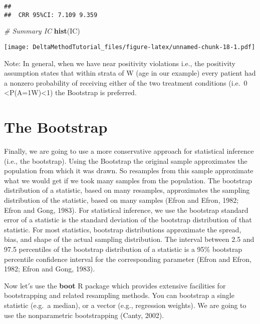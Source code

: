 \documentclass[
]{article}
\newenvironment{Shaded}{\begin{snugshade}}{\end{snugshade}}
\newcommand{\CommentTok}[1]{\textcolor[rgb]{0.56,0.35,0.01}{\textit{#1}}}
\newcommand{\KeywordTok}[1]{\textcolor[rgb]{0.13,0.29,0.53}{\textbf{#1}}}
\newcommand{\NormalTok}[1]{#1}
\begin{document}
\begin{verbatim}
## 
##  CRR 95%CI: 7.109 9.359
\end{verbatim}

\begin{Shaded}
\begin{Highlighting}[]
\CommentTok{# Summary IC}
\KeywordTok{hist}\NormalTok{(IC)}
\end{Highlighting}
\end{Shaded}

\texttt{[image: DeltaMethodTutorial\_files/figure-latex/unnamed-chunk-18-1.pdf]}

Note: In general, when we have near positivity violations i.e., the
positivity assumption states that within strata of W (age in our
example) every patient had a nonzero probability of receiving either of
the two treatment conditions (i.e.~0
\textless P(A=1\textbar W)\textless1) the Bootstrap is preferred.

\hypertarget{the-bootstrap}{%
\section{The Bootstrap}\label{the-bootstrap}}

Finally, we are going to use a more conservative approach for
statistical inference (i.e., the bootstrap). Using the Bootstrap the
original sample approximates the population from which it was drawn. So
resamples from this sample approximate what we would get if we took many
samples from the population. The bootstrap distribution of a statistic,
based on many resamples, approximates the sampling distribution of the
statistic, based on many samples (Efron and Efron, 1982; Efron and Gong,
1983). For statistical inference, we use the bootstrap standard error of
a statistic is the standard deviation of the bootstrap distribution of
that statistic. For most statistics, bootstrap distributions approximate
the spread, bias, and shape of the actual sampling distribution. The
interval between 2.5 and 97.5 percentiles of the bootstrap distribution
of a statistic is a 95\% bootstrap percentile confidence interval for
the corresponding parameter (Efron and Efron, 1982; Efron and Gong,
1983).

Now let\('\)s use the \textbf{boot} R package which provides extensive
facilities for bootstrapping and related resampling methods. You can
bootstrap a single statistic (e.g.~a median), or a vector (e.g.,
regression weights). We are going to use the nonparametric bootstrapping
(Canty, 2002).
\end{document}
